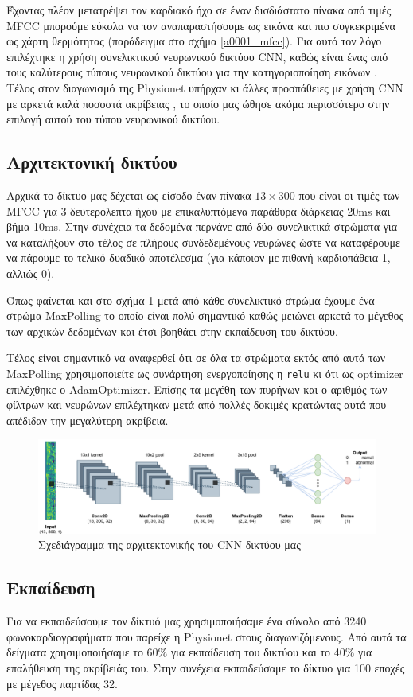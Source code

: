 \documentclass[../main.tex]{subfiles}
\begin{document}
Έχοντας πλέον μετατρέψει τον καρδιακό ήχο σε έναν δισδιάστατο πίνακα από τιμές
MFCC μπορούμε εύκολα να τον αναπαραστήσουμε ως εικόνα και πιο συγκεκριμένα ως
χάρτη θερμότητας (παράδειγμα στο σχήμα \ref{a0001_mfcc}). Για αυτό τον λόγο
επιλέχτηκε η χρήση συνελικτικού νευρωνικού δικτύου CNN, καθώς είναι ένας από
τους καλύτερους τύπους νευρωνικού δικτύου για την κατηγοριοποίηση εικόνων
\cite{ramprasath2018image}. Τέλος στον διαγωνισμό της Physionet \cite{physionet}
υπήρχαν κι άλλες προσπάθειες με χρήση CNN με αρκετά καλά ποσοστά ακρίβειας
\cite{jrubin}, το οποίο μας ώθησε ακόμα περισσότερο στην επιλογή αυτού του τύπου
νευρωνικού δικτύου.

\subsection{Αρχιτεκτονική δικτύου}

Αρχικά το δίκτυο μας δέχεται ως είσοδο έναν πίνακα $13\times300$ που είναι οι
τιμές των MFCC για 3 δευτερόλεπτα ήχου με επικαλυπτόμενα παράθυρα διάρκειας 20ms
και βήμα 10ms. Στην συνέχεια τα δεδομένα περνάνε από δύο συνελικτικά στρώματα
για να καταλήξουν στο τέλος σε πλήρους συνδεδεμένους νευρώνες ώστε να
καταφέρουμε να πάρουμε το τελικό δυαδικό αποτέλεσμα (για κάποιον με πιθανή
καρδιοπάθεια 1, αλλιώς 0).

Όπως φαίνεται και στο σχήμα \ref{cnn} μετά από κάθε συνελικτικό στρώμα έχουμε
ένα στρώμα MaxPolling το οποίο είναι πολύ σημαντικό καθώς μειώνει αρκετά το
μέγεθος των αρχικών δεδομένων και έτσι βοηθάει στην εκπαίδευση του δικτύου.

Τέλος είναι σημαντικό να αναφερθεί ότι σε όλα τα στρώματα εκτός από αυτά των
MaxPolling χρησιμοποιείτε ως συνάρτηση ενεργοποίησης η \verb|relu| κι ότι ως
optimizer επιλέχθηκε ο AdamOptimizer. Επίσης τα μεγέθη των πυρήνων και ο αριθμός
των φίλτρων και νευρώνων επιλέχτηκαν μετά από πολλές δοκιμές κρατώντας αυτά που
απέδιδαν την μεγαλύτερη ακρίβεια.

\begin{figure}[H]
	\includegraphics[width=\textwidth]{../images/cnn.png}
	\caption{Σχεδιάγραμμα της αρχιτεκτονικής του CNN δικτύου μας}
	\label{cnn}
\end{figure}


\subsection{Εκπαίδευση}

Για να εκπαιδεύσουμε τον δίκτυό μας χρησιμοποιήσαμε ένα σύνολο από 3240
φωνοκαρδιογραφήματα που παρείχε η Physionet \cite{physionet} στους
διαγωνιζόμενους. Από αυτά τα δείγματα χρησιμοποιήσαμε το 60\% για εκπαίδευση του
δικτύου και το 40\% για επαλήθευση της ακρίβειάς του. Στην συνέχεια εκπαιδεύσαμε
το δίκτυο για 100 εποχές με μέγεθος παρτίδας 32.
\end{document}
